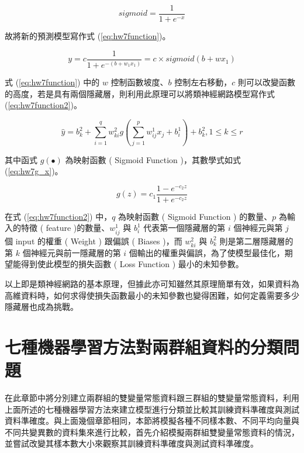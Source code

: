 \begin{equation}\label{eq:hw7sigmoid}
sigmoid = \frac{1}{1+e^{-x}}
\end{equation}

故將新的預測模型寫作式 (\ref{eq:hw7function})。

\begin{equation}\label{eq:hw7function}
y=c \frac{1}{1+e^{-(b+w_1 x_1)}}=c \times sigmoid(b+w x_1)
\end{equation}

式 (\ref{eq:hw7function}) 中的 $w$ 控制函數坡度、$b$ 控制左右移動，$c$ 則可以改變函數的高度，若是具有兩個隱藏層，則利用此原理可以將類神經網路模型寫作式 (\ref{eq:hw7function2})。

\begin{equation}\label{eq:hw7function2}
\hat{y}=b_k^{2}+\sum_{i=1}^{q} w_{ki}^{2} g(\sum_{j=1}^{p} w_{ij}^{1} x_j +b_i^{1})+b_k^{2}, 1 \leq k \leq r 
\end{equation}

其中函式 $g(\bullet)$ 為映射函數 ( Sigmoid Function )，其數學式如式  (\ref{eq:hw7g_x})。

\begin{equation}\label{eq:hw7g_x}
g(z)=c_1 \frac{1-e^{-c_2 z}}{1+ e^{-c_2 z}}
\end{equation}

在式 (\ref{eq:hw7function2}) 中，$q$ 為映射函數 ( Sigmoid Function ) 的數量、$p$ 為輸入的特徵 ( feature )的數量、$w_{ij}^{1}$ 與 $b_i^{1}$ 代表第一個隱藏層的第 $i$ 個神經元與第 $j$ 個 input 的權重 ( Weight ) 跟偏誤 ( Biases )，而 $w_{ki}^{2}$ 與 $b_k^{2}$ 則是第二層隱藏層的第 $k$ 個神經元與前一隱藏層的第 $i$ 個輸出的權重與偏誤，為了使模型最佳化，期望能得到使此模型的損失函數 ( Loss Function ) 最小的未知參數。

以上即是類神經網路的基本原理，但據此亦可知雖然其原理簡單有效，如果資料為高維資料時，如何求得使損失函數最小的未知參數也變得困難，如何定義需要多少隱藏層也成為挑戰。


\section{七種機器學習方法對兩群組資料的分類問題}

在此章節中將分別建立兩群組的雙變量常態資料跟三群組的雙變量常態資料，利用上面所述的七種機器學習方法來建立模型進行分類並比較其訓練資料準確度與測試資料準確度。與上面幾個章節相同，本節將模擬各種不同樣本數、不同平均向量與不同共變異數的資料集來進行比較，首先介紹模擬兩群組雙變量常態資料的情況，並嘗試改變其樣本數大小來觀察其訓練資料準確度與測試資料準確度。

